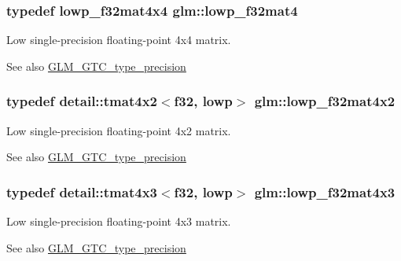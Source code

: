 \subsubsection[{\texorpdfstring{lowp\+\_\+f32mat4}{lowp_f32mat4}}]{\setlength{\rightskip}{0pt plus 5cm}typedef lowp\+\_\+f32mat4x4 {\bf glm\+::lowp\+\_\+f32mat4}}\hypertarget{group__gtc__type__precision_gada4d11f44b410c1be7b6b1d05ccf692c}{}\label{group__gtc__type__precision_gada4d11f44b410c1be7b6b1d05ccf692c}
Low single-\/precision floating-\/point 4x4 matrix. \begin{DoxySeeAlso}{See also}
\hyperlink{group__gtc__type__precision}{G\+L\+M\+\_\+\+G\+T\+C\+\_\+type\+\_\+precision} 
\end{DoxySeeAlso}
\subsubsection[{\texorpdfstring{lowp\+\_\+f32mat4x2}{lowp_f32mat4x2}}]{\setlength{\rightskip}{0pt plus 5cm}typedef detail\+::tmat4x2$<$f32, lowp$>$ {\bf glm\+::lowp\+\_\+f32mat4x2}}\hypertarget{group__gtc__type__precision_ga6eedee3981e5bf150ad7463786d0d694}{}\label{group__gtc__type__precision_ga6eedee3981e5bf150ad7463786d0d694}
Low single-\/precision floating-\/point 4x2 matrix. \begin{DoxySeeAlso}{See also}
\hyperlink{group__gtc__type__precision}{G\+L\+M\+\_\+\+G\+T\+C\+\_\+type\+\_\+precision} 
\end{DoxySeeAlso}
\subsubsection[{\texorpdfstring{lowp\+\_\+f32mat4x3}{lowp_f32mat4x3}}]{\setlength{\rightskip}{0pt plus 5cm}typedef detail\+::tmat4x3$<$f32, lowp$>$ {\bf glm\+::lowp\+\_\+f32mat4x3}}\hypertarget{group__gtc__type__precision_gadd0ff5b09c6ecac83e4e908e3f6478c7}{}\label{group__gtc__type__precision_gadd0ff5b09c6ecac83e4e908e3f6478c7}
Low single-\/precision floating-\/point 4x3 matrix. \begin{DoxySeeAlso}{See also}
\hyperlink{group__gtc__type__precision}{G\+L\+M\+\_\+\+G\+T\+C\+\_\+type\+\_\+precision} 
\end{DoxySeeAlso}
